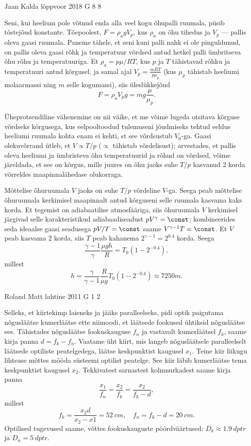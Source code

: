\documentclass[11pt]{article}
\begin{document}
{%
{Jaan Kalda} %
{lõppvoor} %
{2018} %
{G 8} %
{8} %
{

\ifSolution
Seni, kui heelium pole võtnud enda alla veel kogu õhupalli ruumala, püsib tõstejõud konstante. Tõepoolest, $F=\rho_a g V_p$, kus $\rho_a$ on õhu tihedus ja $V_p$ --- pallis oleva gaasi ruumala. Paneme tähele, et seni kuni palli nahk ei ole pinguldunud, on pallis oleva gaasi rõhk ja temperatuur võrdsed antud hetkel palli ümbritseva õhu rõhu ja temperatuuriga. Et $\rho_a=p\mu/RT$, kus $p$ ja $T$ tähistavad rõhku ja temperatuuri antud kõrgusel, ja samal ajal $V_p=\frac {mRT}{p\mu_p}$ (kus $\mu_p$ tähistab heeliumi molaarmassi ning $m$ selle kogumassi), siis üleslükkejõud
\[
F=\rho_a V_p g=mg\frac{\mu}{\mu_p}.
\]

Üheprotsendiline vähenemine on nii väike, et me võime lugeda otsitava kõrguse võrdseks kõrgusega, kus eelpooltoodud tulemuseni jõudmiseks tehtud eeldus heeliumi ruumala kohta enam ei kehti, st see võrdsustub $V_0$-ga. Gaasi olekuvõrrand ütleb, et $V\propto T/p$ ($\propto$ tähistab võrdelisust); arvestades, et pallis oleva heeliumi ja ümbristeva õhu temperatuurid ja rõhud on võrdsed, võime järeldada, et see on kõrgus, mille juures on õhu jaoks suhe $T/p$ kasvanud 2 korda võrreldes maapinnalähedase olukorraga. 

Mõttelise õhuruumala $V$ jaoks on suhe $T/p$ võrdeline $V$-ga. Seega peab mõttelise õhuruumala kerkimisel maapinnalt antud kõrguseni selle ruumala kasvama kaks korda. Et tegemist on adiabaatilise atmosfääriga, siis õhuruumala $V$ kerkimisel järgivad selle karakteristikud adiabaadiseadust $pV^\gamma=\const$; kombineerides seda ideaalse gaasi seadusega $pV/T=\const$ saame $V^{\gamma-1}T=\const$. Et $V$ peab kasvama 2 korda, siis $T$ peab kahanema $2^{\gamma-1}=2^{0.4}$ korda. Seega
\[
\frac{\gamma-1}\gamma\frac{\mu g h}R =T_0(1-2^{-0.4}),
\]
millest
\[
h=\frac\gamma{\gamma-1}\frac R{\mu g}T_0(1-2^{-0.4})\approx\SI{7250}m.
\]
\fi
}

{Roland Matt} %
{lahtine} %
{2011} %
{G 1} %
{2} %
{

\ifSolution
Selleks, et kiirtekimp laieneks ja jääks paralleelseks, pidi optik paigutama
nõgusläätse kumerläätse ette niimoodi, et läätsede fookused ühtiksid nõgusläätse
ees. Tähistades nõgusläätse fookuskauguse $f_{n}$ ja vastavalt kumerläätsel
$f_{k}$, saame kirja panna $d=f_{k}-f_{n}$. Vaatame üht kiirt, mis langeb
nõgusläätsele paralleelselt läätsede optiliste peatelgedega, läätse keskpunktist
kaugusel $x_{1}$. Teine kiir liikugu lihtsuse mõttes mööda süsteemi optilist
peatelge. See kiir läbib kumerläätse tema keskpunktist kaugusel $x_{2}$.
Tekkivatest sarnastest kolmnurkadest saame kirja panna
\[ \frac{x_{1}}{f_{n}}=\frac{x_{2}}{f_{k}}=\frac{x_{2}}{f_{k}-d}, \] millest
\[ f_{k}=\frac{x_{2}d}{x_{2}-x{1}}=\SI{52}{cm},\quad f_{n}=f_{k}-d=\SI{20}{cm}.\]
Optilised tugevused saame, võttes fookuskauguste pöördväärtused:
$D_{k}\approx\SI{1,9}{dptr}$ ja $D_{n}=\SI{5}{dptr}$.
\fi
}

}
\end{document}
